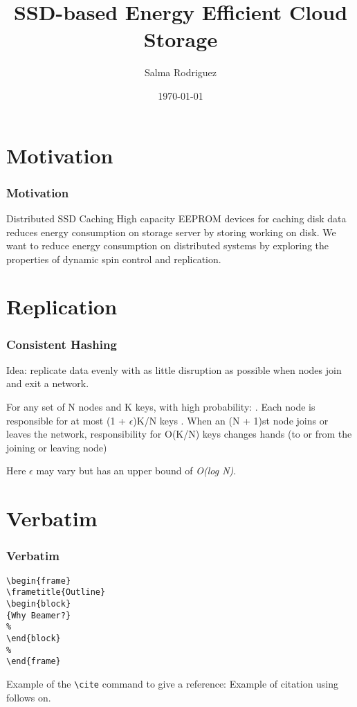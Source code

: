 \documentclass{beamer}
\title[the title]{SSD-based Energy Efficient Cloud Storage}
\author{Salma Rodriguez}
\institute[University] {
Florida International University \\
\medskip
{\emph{srodr063@fiu.edu}}
}
\date{\today}
\begin{document}
%
\begin{frame}
\titlepage
\end{frame}
%
\section{Motivation}
\begin{frame}
\frametitle{Motivation}
\begin{block}
{Distributed SSD Caching}
High capacity EEPROM devices for caching disk data
reduces energy consumption on storage server by storing
working on disk. We want to reduce energy consumption
on distributed systems by exploring the properties of
dynamic spin control and replication.
\end{block}
\end{frame}
%
\section{Replication}
\begin{frame}
\frametitle{Consistent Hashing}
Idea: replicate data evenly with as little disruption
as possible when nodes join and exit a network. \\
\begin{theorem}
For any set of N nodes and K keys, with high probability:
\newline{}. Each node is responsible for at most (1 + $\epsilon$)K/N keys
\newline{}. When an (N + 1)st node joins or leaves the network,
   responsibility for O(K/N) keys changes hands (to or from
   the joining or leaving node)
\end{theorem}
Here $\epsilon$ may vary but has an upper bound of \textit{O(log N)}.
\end{frame}
%
\section{Verbatim}
\begin{frame}[fragile]
\frametitle{Verbatim}
\begin{example}
\begin{verbatim}
\begin{frame}
\frametitle{Outline}
\begin{block}
{Why Beamer?}
%
\end{block}
%
\end{frame}\end{verbatim}
\end{example}
\end{frame}
%
\begin{frame}[fragile]
%
Example of the \verb|\cite| command to give a reference:
Example of citation using \cite{key1} follows on.
\end{frame}
%
\end{document}
